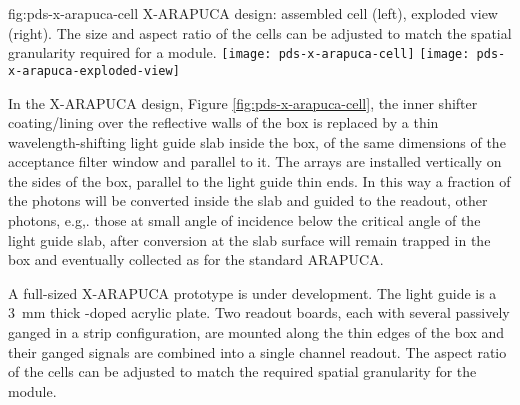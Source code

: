  \begin{dunefigure}{fig:pds-x-arapuca-cell}
{X-ARAPUCA design: assembled cell (left),  exploded view (right). The size and aspect ratio of the cells can be adjusted to match the spatial granularity required for a  module.}
  \texttt{[image: pds-x-arapuca-cell]}
  \texttt{[image: pds-x-arapuca-exploded-view]}
\end{dunefigure}


In the X-ARAPUCA design, Figure \ref{fig:pds-x-arapuca-cell}, the inner shifter coating/lining over the reflective walls of the box is replaced by a thin wavelength-shifting light guide slab inside the box, of the same dimensions of the acceptance filter window and parallel to it. The  arrays are installed vertically on the sides of the box, parallel to the light guide thin ends. 
 In this way a fraction of the photons will be converted inside the slab and guided to the readout, other photons,  e.g,. those at small angle of incidence below the critical angle of the light guide slab, after conversion at the slab surface will remain trapped in the box and eventually collected as for the standard ARAPUCA.
 
 A full-sized X-ARAPUCA prototype is under development. The light guide is a \SI{3}{mm} thick -doped acrylic plate. Two readout boards, each with several passively ganged  in a strip configuration, are mounted along the thin edges of the box and their ganged signals are combined into a single channel readout. 
 The aspect ratio of the cells can be adjusted to match the required spatial granularity for the  module.
 

